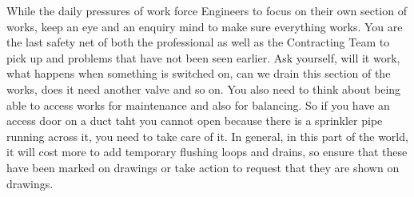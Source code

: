 While the daily pressures of work force Engineers to focus on their own section
of works, keep an eye and an enquiry mind to make sure everything works. You 
are the last safety net of both the professional as well as the Contracting Team
to pick up and problems that have not been seen earlier. Ask yourself, will
it work, what happens when something is switched on, can we drain this section
of the works, does it need another valve and so on. You also need to think about
being able to access works for maintenance and also for balancing. So if you have
an access door on a duct taht you cannot open because there is a sprinkler pipe
running across it, you need to take care of it. In general, in this part of the
world, it will cost more to add temporary flushing loops and drains, so ensure
that these have been marked on drawings or take action to request that they are
shown on drawings.



































































